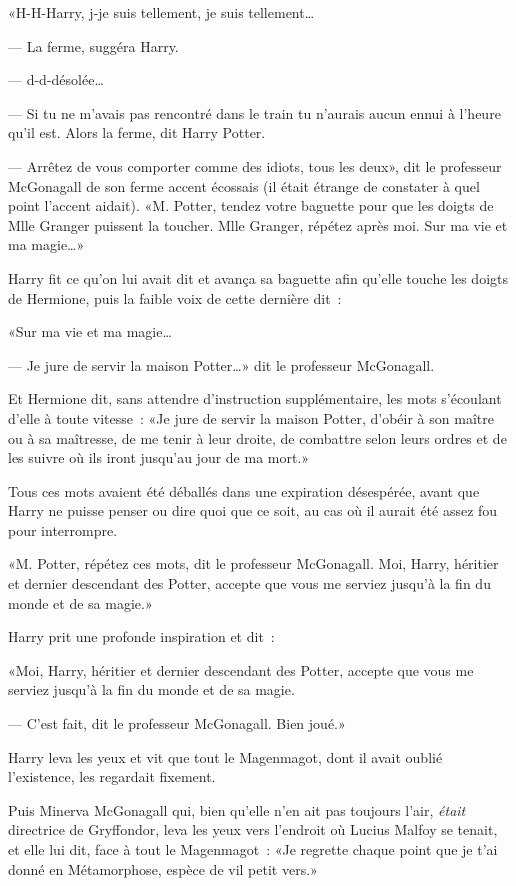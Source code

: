 «H-H-Harry, j-je suis tellement, je suis tellement…

--- La ferme, suggéra Harry.

--- d-d-désolée…

--- Si tu ne m'avais pas rencontré dans le train tu n'aurais aucun ennui à l'heure qu'il est. Alors la ferme, dit Harry Potter.

--- Arrêtez de vous comporter comme des idiots, tous les deux», dit le professeur McGonagall de son ferme accent écossais (il était étrange de constater à quel point l'accent aidait). «M. Potter, tendez votre baguette pour que les doigts de Mlle Granger puissent la toucher. Mlle Granger, répétez après moi. Sur ma vie et ma magie…»

Harry fit ce qu'on lui avait dit et avança sa baguette afin qu'elle touche les doigts de Hermione, puis la faible voix de cette dernière dit~:

«Sur ma vie et ma magie…

--- Je jure de servir la maison Potter…» dit le professeur McGonagall.

Et Hermione dit, sans attendre d'instruction supplémentaire, les mots s'écoulant d'elle à toute vitesse~: «Je jure de servir la maison Potter, d'obéir à son maître ou à sa maîtresse, de me tenir à leur droite, de combattre selon leurs ordres et de les suivre où ils iront jusqu'au jour de ma mort.»

Tous ces mots avaient été déballés dans une expiration désespérée, avant que Harry ne puisse penser ou dire quoi que ce soit, au cas où il aurait été assez fou pour interrompre.

«M. Potter, répétez ces mots, dit le professeur McGonagall. Moi, Harry, héritier et dernier descendant des Potter, accepte que vous me serviez jusqu'à la fin du monde et de sa magie.»

Harry prit une profonde inspiration et dit~:

«Moi, Harry, héritier et dernier descendant des Potter, accepte que vous me serviez jusqu'à la fin du monde et de sa magie.

--- C'est fait, dit le professeur McGonagall. Bien joué.»

Harry leva les yeux et vit que tout le Magenmagot, dont il avait oublié l'existence, les regardait fixement.

Puis Minerva McGonagall qui, bien qu'elle n'en ait pas toujours l'air, \emph{était} directrice de Gryffondor, leva les yeux vers l'endroit où Lucius Malfoy se tenait, et elle lui dit, face à tout le Magenmagot~: «Je regrette chaque point que je t'ai donné en Métamorphose, espèce de vil petit vers.»

